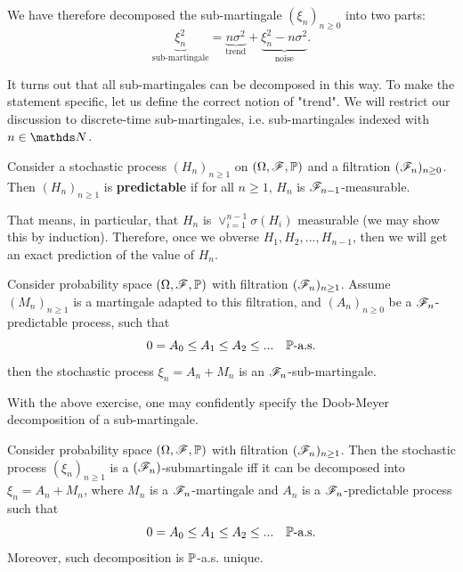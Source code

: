 We have therefore decomposed the sub-martingale $(\xi_n)_{n\geq 0}$ into two parts:
\begin{equation}
    \underbrace{\xi_n^2}_{\text{sub-martingale}} = \underbrace{n\sigma^2}_{\text{trend}} + \underbrace{\xi_n^2 - n\sigma^2}_{\text{noise}}.
\end{equation}

It turns out that all sub-martingales can be decomposed in this way. To make the statement specific, let us define the correct notion of "trend". We will restrict our discussion to discrete-time sub-martingales, i.e. sub-martingales indexed with $n \in \N$.

\begin{definition}
Consider a stochastic process $(H_n)_{n\geq 1}$ on $(\Omega,\mathcal{F},\mathbb{P})$ and a filtration $(\mathcal{F}_n)_{n\geq 0}$. Then $(H_n)_{n\geq 1}$ is \textbf{predictable} if for all $n \geq 1$, $H_n$ is $\mathcal{F}_{n-1}$-measurable. 
\end{definition}

That means, in particular, that $H_n$ is $\vee_{i=1}^{n-1} \sigma(H_i)$ measurable (we may show this by induction). Therefore, once we obverse $H_1, H_2, ..., H_{n-1}$, then we will get an exact prediction of the value of $H_n$.

\begin{exercise}
Consider probability space $(\Omega,\mathcal{F},\mathbb{P})$ with filtration $(\mathcal{F}_n)_{n\geq 1}$. Assume $(M_n)_{n\geq 1}$ is a martingale adapted to this filtration, and $(A_n)_{n\geq 0}$ be a $\mathcal{F}_n$-predictable process, such that
\begin{equation*}
    0 = A_0 \leq A_1 \leq A_2 \leq ... \quad \mathbb{P}\text{-a.s.}
\end{equation*}
then the stochastic process $\xi_n = A_n + M_n$ is an $\mathcal{F}_n$-sub-martingale.
\end{exercise}

With the above exercise, one may confidently specify the Doob-Meyer decomposition of a sub-martingale.
\begin{proposition}
Consider probability space $(\Omega,\mathcal{F},\mathbb{P})$ with filtration $(\mathcal{F}_n)_{n\geq 1}$. Then the stochastic process $(\xi_n)_{n\geq 1}$ is a $(\mathcal{F}_n)$-submartingale iff it can be decomposed into $\xi_n = A_n + M_n$, where $M_n$ is a $\mathcal{F}_n$-martingale and $A_n$ is a $\mathcal{F}_n$-predictable process such that
\begin{equation*}
    0 = A_0 \leq A_1 \leq A_2 \leq ... \quad \mathbb{P}\text{-a.s.}
\end{equation*}
Moreover, such decomposition is $\mathbb{P}$-a.s. unique.
\end{proposition}

